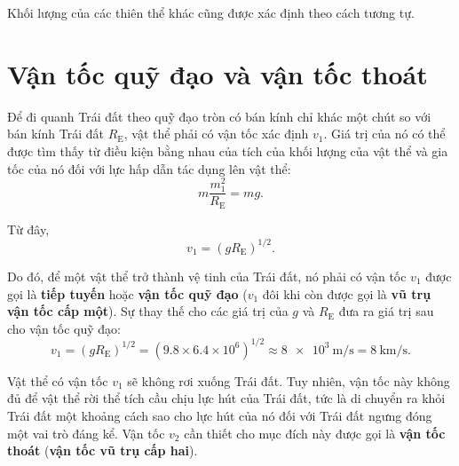 Khối lượng của các thiên thể khác cũng được xác định theo cách tương tự.

\section{Vận tốc quỹ đạo và vận tốc thoát}\label{sec:6_4}

Để đi quanh Trái đất theo quỹ đạo tròn có bán kính chỉ khác một chút so với bán kính Trái đất $R_ {\text {E}}$, vật thể phải có vận tốc xác định $v_1$. Giá trị của nó có thể được tìm thấy từ điều kiện bằng nhau của tích của khối lượng của vật thể và gia tốc của nó đối với lực hấp dẫn tác dụng lên vật thể:
\begin{equation*}
	m\frac{m_1^2}{R_{\text{E}}} = mg.
\end{equation*}

\noindent
Từ đây,
\begin{equation}\label{eq:6_24}
	v_1 = (gR_{\text{E}})^{1/2}.
\end{equation}

Do đó, để một vật thể trở thành vệ tinh của Trái đất, nó phải có vận tốc $v_1$ được gọi là \textbf{tiếp tuyến} hoặc \textbf{vận tốc quỹ đạo} ($v_1$ đôi khi còn được gọi là \textbf{vũ trụ vận tốc cấp một}). Sự thay thế cho các giá trị của $g$ và $R _{\text{E}}$ đưa ra giá trị sau cho vận tốc quỹ đạo:
\begin{equation*}
	v_1 = (gR_{\text{E}})^{1/2} = (9.8 \times 6.4 \times 10^6)^{1/2} \approx \SI{8e3}{\metre\per\second} = \SI{8}{\kilo\metre\per\second}.
\end{equation*}

Vật thể có vận tốc $v_1$ sẽ không rơi xuống Trái đất. Tuy nhiên, vận tốc này không đủ để vật thể rời thể tích cầu chịu lực hút của Trái đất, tức là di chuyển ra khỏi Trái đất một khoảng cách sao cho lực hút của nó đối với Trái đất ngưng đóng một vai trò đáng kể. Vận tốc $v_2$ cần thiết cho mục đích này được gọi là \textbf{vận tốc thoát} (\textbf{vận tốc vũ trụ cấp hai}).


